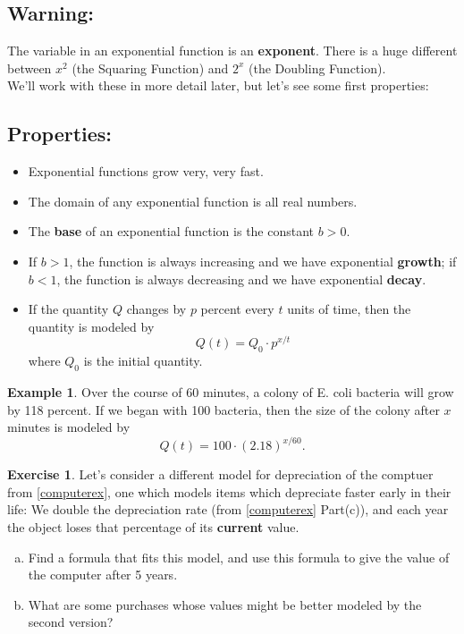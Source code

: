 \documentclass[11pt,reqno,final]{amsart}
\numberwithin{equation}{section}
\numberwithin{figure}{section}
\theoremstyle{definition} %
\newtheorem*{example*}{Example}%
\newtheorem{exercise}{Exercise}
\begin{document}
\subsection*{Warning:} The variable in an exponential function is an \textbf{exponent}.
There is a huge different between
$x^2$ (the Squaring Function) and $2^x$ (the Doubling Function).\\

We'll work with these in more detail later, but let's see some first properties:

\subsection*{Properties:}
\begin{itemize}
\item Exponential functions grow very, very fast.
\item The domain of any exponential function is all real numbers.
\item The \textbf{base} of an exponential function is the constant $b > 0$.
\item If $b > 1$, the function is always increasing and we have exponential \textbf{growth};
        if $b < 1$, the function is always decreasing and we have exponential \textbf{decay}.
\item If the quantity $Q$ changes by $p$ percent every $t$ units of time, then the quantity is modeled by
        \[
                Q(t) = Q_0 \cdot p^{x/t}
        \]
        where $Q_0$ is the initial quantity.
\end{itemize}

\begin{example*}
        Over the course of 60 minutes, a colony of E. coli bacteria will grow by 118 percent.
        If we began with 100 bacteria, then the size of the colony after $x$ minutes is modeled by
        \[
                Q(t) = 100 \cdot (2.18)^{x/60}.
        \]
\end{example*}

\begin{exercise}
        Let's consider a different model for depreciation of the comptuer from \cref{computerex},
        one which models items which depreciate faster early in their life:
        We double the depreciation rate (from \cref{computerex} Part(c)), and each year the object loses that percentage of its \textbf{current} value.
        \begin{enumerate}[(a)]
        \item Find a formula that fits this model, and
                use this formula to give the value of the computer after 5 years.
                \vfill
                \vfill
        \item What are some purchases whose values might be better modeled by the second version?
                \vfill
        \end{enumerate}        
\end{exercise}
\end{document}
